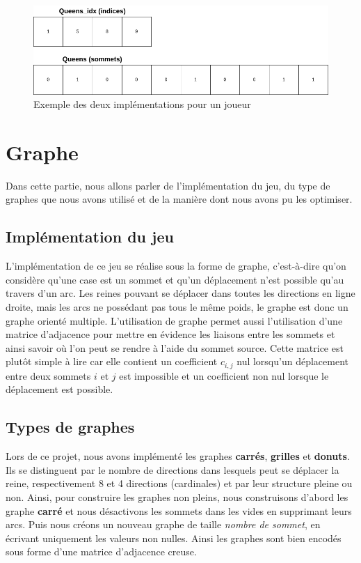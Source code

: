 \documentclass{article}
\begin{document}
\begin{figure}[!h]
    \centering
    \includegraphics[width=12cm]{queen.drawio.png}
    \caption{Exemple des deux implémentations pour un joueur}
    \label{fig:queen}
\end{figure}

\newpage
\section{Graphe}
\label{graph}
Dans cette partie, nous allons parler de l'implémentation du jeu, du type de graphes que nous avons utilisé et de la manière dont nous avons pu les optimiser.

\subsection{Implémentation du jeu}
L'implémentation de ce jeu se réalise sous la forme de graphe, c'est-à-dire qu'on considère qu'une case est un sommet et qu'un déplacement n'est possible qu'au travers d'un arc. Les reines pouvant se déplacer dans toutes les directions en ligne droite, mais les arcs ne possédant pas tous le même poids, le graphe est donc un graphe orienté multiple. L'utilisation de graphe permet aussi l'utilisation d'une matrice d'adjacence pour mettre en évidence les liaisons entre les sommets et ainsi savoir où l'on peut se rendre à l'aide du sommet source. Cette matrice est plutôt simple à lire car elle contient un coefficient $c_{i,j}$ nul lorsqu'un déplacement entre deux sommets $i$ et $j$ est impossible et un coefficient non nul lorsque le déplacement est possible. 

\subsection{Types de graphes}
Lors de ce projet, nous avons implémenté les graphes \textbf{carrés}, \textbf{grilles} et \textbf{donuts}. Ils se distinguent par le nombre de directions dans lesquels peut se déplacer la reine, respectivement 8 et 4 directions (cardinales) et par leur structure pleine ou non. Ainsi, pour
construire les graphes non pleins, nous construisons d'abord les graphe \textbf{carré} et nous désactivons les sommets dans les vides en supprimant leurs arcs. Puis nous créons un nouveau graphe de taille \textit{nombre de sommet}, en écrivant uniquement les valeurs non nulles. Ainsi les graphes sont bien encodés sous forme d'une matrice d'adjacence creuse.
\end{document}
